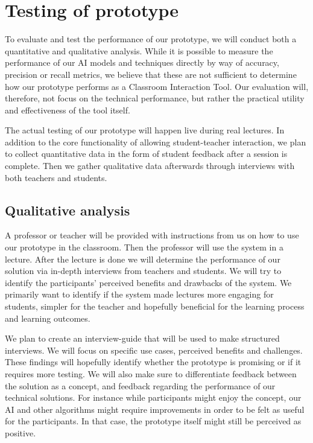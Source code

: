 \section{Testing of prototype}
To evaluate and test the performance of our prototype, we will conduct both a quantitative and qualitative analysis. While it is possible to measure the performance of our AI models and techniques directly by way of accuracy, precision or recall metrics, we believe that these are not sufficient to determine how our prototype performs as a Classroom Interaction Tool. Our evaluation will, therefore, not focus on the technical performance, but rather the practical utility and effectiveness of the tool itself. 

The actual testing of our prototype will happen live during real lectures. In addition to the core functionality of allowing student-teacher interaction, we plan to collect quantitative data in the form of student feedback after a session is complete. Then we gather qualitative data afterwards through interviews with both teachers and students.


\subsection{Qualitative analysis}
A professor or teacher will be provided with instructions from us on how to use our prototype in the classroom. Then the professor will use the system in a lecture. After the lecture is done we will determine the performance of our solution via in-depth interviews from teachers and students. We will try to identify the participants' perceived benefits and drawbacks of the system. We primarily want to identify if the system made lectures more engaging for students, simpler for the teacher and hopefully beneficial for the learning process and learning outcomes.

We plan to create an interview-guide that will be used to make structured interviews. We will focus on specific use cases, perceived benefits and challenges. These findings will hopefully identify whether the prototype is promising or if it requires more testing. We will also make sure to differentiate feedback between the solution as a concept, and feedback regarding the performance of our technical solutions. For instance while participants might enjoy the concept, our AI and other algorithms might require improvements in order to be felt as useful for the participants. In that case, the prototype itself might still be perceived as positive.


